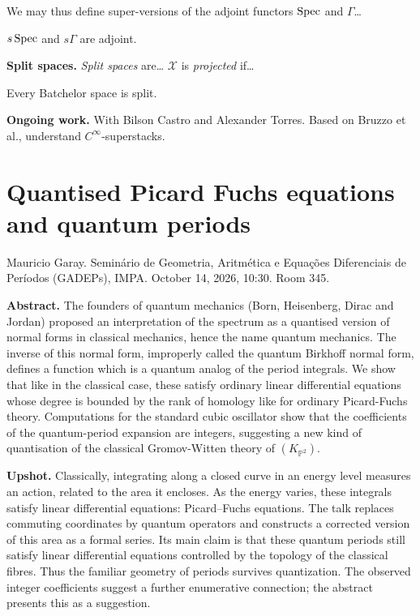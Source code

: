  We may thus define
super-versions of the adjoint functors
$\mathop{\mathrm{Spec}}$ and $\Gamma$…

\begin{theorem}[A]
\label{theorem-a-superring}
$s\mathop{\mathrm{Spec}}$ and $s\Gamma$ are adjoint.
\end{theorem}

\begin{theorem}[B]
\label{theorem-b-superring}
\end{theorem}

\medskip\noindent
{\bf Split spaces.}
{\it Split spaces} are… $\mathcal{X}$ is
{\it projected} if…

\begin{theorem}[C]
\label{theorem-c-superring}
Every Batchelor space is split.
\end{theorem}


\medskip\noindent
{\bf Ongoing work.}
With Bilson Castro and Alexander Torres.
Based on Bruzzo et al., understand
$C^\infty$-superstacks.

\section{Quantised Picard Fuchs equations
and quantum periods}
\label{section-garay-quantum-periods}

\noindent
Mauricio Garay.
Seminário de Geometria, Aritmética e
Equações Diferenciais de Períodos
(GADEPs), IMPA.
October 14, 2026, 10:30. Room 345.

\medskip\noindent
{\bf Abstract.}
The founders of quantum mechanics (Born,
Heisenberg, Dirac and Jordan) proposed an
interpretation of the spectrum as a
quantised version of normal forms in
classical mechanics, hence the name quantum
mechanics. The inverse of this normal form,
improperly called the quantum Birkhoff
normal form, defines a function which is a
quantum analog of the period integrals.
We show that like in the classical case,
these satisfy ordinary linear differential
equations whose degree is bounded by the
rank of homology like for ordinary
Picard-Fuchs theory. Computations for the
standard cubic oscillator show that the
coefficients of the quantum-period expansion
are integers, suggesting a new kind of
quantisation of the classical Gromov-Witten
theory of $(K_{\mathbb{P}^2})$.

\medskip\noindent
{\bf Upshot.}
Classically, integrating along a closed
curve in an energy level measures an
action, related to the area it encloses.
As the energy varies, these integrals
satisfy linear differential equations:
Picard--Fuchs equations. The talk replaces
commuting coordinates by quantum
operators and constructs a corrected
version of this area as a formal series.
Its main claim is that these quantum
periods still satisfy linear differential
equations controlled by the topology of
the classical fibres. Thus the familiar
geometry of periods survives quantization.
The observed integer coefficients suggest
a further enumerative connection; the
abstract presents this as a suggestion.

